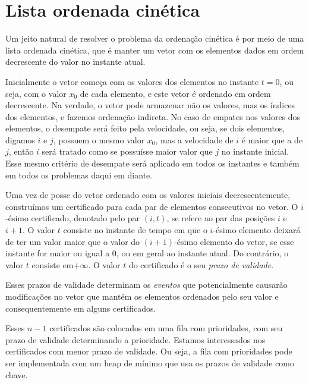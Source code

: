 


\section{Lista ordenada cinética}
\label{sec:lista}
Um jeito natural de resolver o problema da ordenação cinética é por
meio de uma lista ordenada cinética, que é manter um vetor com os
elementos dados em ordem decrescente do valor no instante atual.

Inicialmente o vetor começa com os valores dos elementos no instante
$t = 0$, ou seja, com o valor $x_0$ de cada elemento, e este vetor é
ordenado em ordem decrescente.
Na verdade, o vetor pode armazenar não os valores, mas os índices dos elementos, e fazemos
ordenação indireta.
No caso de empates nos valores dos elementos, o desempate
será feito pela velocidade, ou seja, se dois elementos, digamos $i$
e $j$, possuem o mesmo valor $x_0$, mas a velocidade de $i$ é maior
que a de $j$, então $i$ será tratado como se possuísse maior valor
que $j$ no instante inicial.
Esse mesmo critério de desempate será aplicado em todos os instantes e também em todos os problemas daqui
em diante.

Uma vez de posse do vetor ordenado com os valores iniciais
decrescentemente, construímos um certificado para cada par de
elementos consecutivos no vetor.
O $i$-ésimo certificado, denotado pelo par $(i, t)$, se refere ao par das posições $i$ e $i + 1$.
O valor $t$ consiste no instante de tempo em que o $i$-ésimo elemento
deixará de ter um valor maior que o valor do $(i + 1)$-ésimo
elemento do vetor, se esse instante for maior ou igual a 0, ou em
geral ao instante atual.
Do contrário, o valor $t$ consiste em$+\infty$.
O valor $t$ do certificado é o seu \textit{prazo de
validade}.

Esses prazos de validade determinam os \textit{eventos} que
potencialmente causarão modificações no vetor que mantém os
elementos ordenados pelo seu valor e consequentemente em alguns
certificados.

Esses $n - 1$ certificados são colocados em uma fila com
prioridades, com seu prazo de validade determinando a prioridade.
Estamos interessados nos certificados com menor prazo de validade.
Ou seja, a fila com prioridades pode ser implementada com um heap de
mínimo que usa os prazos de validade como chave.

